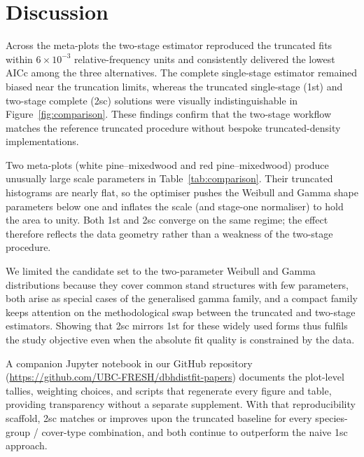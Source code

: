 \section{Discussion}

Across the meta-plots the two-stage estimator reproduced the truncated fits within $6 \times 10^{-3}$ relative-frequency units and consistently delivered the lowest AICc among the three alternatives. The complete single-stage estimator remained biased near the truncation limits, whereas the truncated single-stage (1st) and two-stage complete (2sc) solutions were visually indistinguishable in Figure~\ref{fig:comparison}. These findings confirm that the two-stage workflow matches the reference truncated procedure without bespoke truncated-density implementations.

Two meta-plots (white pine--mixedwood and red pine--mixedwood) produce unusually large scale parameters in Table~\ref{tab:comparison}. Their truncated histograms are nearly flat, so the optimiser pushes the Weibull and Gamma shape parameters below one and inflates the scale (and stage-one normaliser) to hold the area to unity. Both 1st and 2sc converge on the same regime; the effect therefore reflects the data geometry rather than a weakness of the two-stage procedure.

We limited the candidate set to the two-parameter Weibull and Gamma distributions because they cover common stand structures with few parameters, both arise as special cases of the generalised gamma family, and a compact family keeps attention on the methodological swap between the truncated and two-stage estimators. Showing that 2sc mirrors 1st for these widely used forms thus fulfils the study objective even when the absolute fit quality is constrained by the data.

A companion Jupyter notebook in our GitHub repository (\url{https://github.com/UBC-FRESH/dbhdistfit-papers}) documents the plot-level tallies, weighting choices, and scripts that regenerate every figure and table, providing transparency without a separate supplement. With that reproducibility scaffold, 2sc matches or improves upon the truncated baseline for every species-group / cover-type combination, and both continue to outperform the naive 1sc approach.
